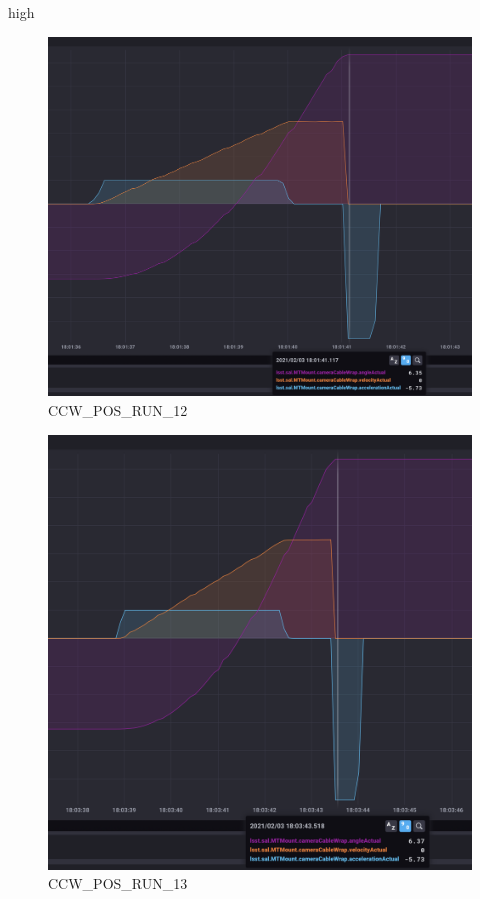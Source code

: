 high\documentclass[SE,lsstdraft,authoryear,toc]{lsstdoc}
\begin{document}
\begin{figure}[h!]
  \includegraphics[width=\linewidth]{media/CCW_design_speed_pos_test12.png}
  \caption{CCW\_POS\_RUN\_12}
  \label{fig:CCW_POS_RUN_12}
\end{figure}
\begin{figure}[h!]
  \includegraphics[width=\linewidth]{media/CCW_design_speed_pos_test13.png}
  \caption{CCW\_POS\_RUN\_13}
  \label{fig:CCW_POS_RUN_13}
\end{figure}
\end{document}
